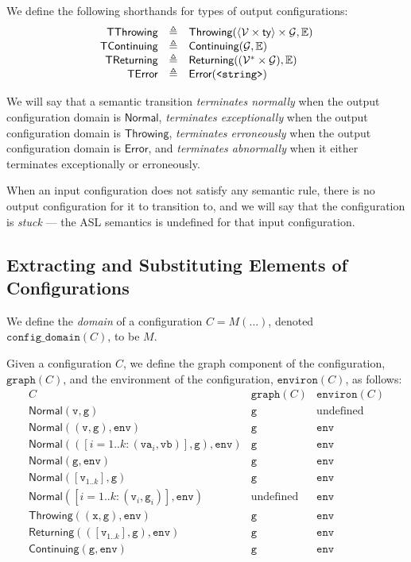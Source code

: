 \documentclass{book}
\newcommand\XGraphs[0]{\mathcal{G}}
\newcommand\vals[0]{\mathcal{V}}
\newcommand\configdomain[1]{\texttt{config\_domain}({#1})}
\newcommand\graphof[1]{\texttt{graph}({#1})}
\newcommand\environof[1]{\texttt{environ}({#1})}
\newcommand\TError[0]{\textsf{TError}}
\newcommand\TThrowing[0]{\textsf{TThrowing}}
\newcommand\TContinuing[0]{\textsf{TContinuing}}
\newcommand\TReturning[0]{\textsf{TReturning}}
\newcommand\Normal[0]{\textsf{Normal}}
\newcommand\Throwing[0]{\textsf{Throwing}}
\newcommand\Continuing[0]{\textsf{Continuing}}
\newcommand\Returning[0]{\textsf{Returning}}
\newcommand\Error[0]{\textsf{Error}}
\newcommand\env[0]{\texttt{env}}
\newcommand\vg[0]{\texttt{g}}
\newcommand\vv[0]{\texttt{v}}
\newcommand\vx[0]{\texttt{x}}
\begin{document}
We define the following shorthands for types of output configurations:
\[
  \begin{array}{rcl}
    \TThrowing        &\triangleq& \Throwing(\langle\vals \times \ty\rangle \times \XGraphs, \envs)\\
    \TContinuing      &\triangleq& \Continuing(\XGraphs, \envs)\\
    \TReturning       &\triangleq& \Returning((\vals^* \times \XGraphs), \envs)\\
    \TError           &\triangleq& \Error(\texttt{<string>})\\
  \end{array}
\]

We will say that a semantic transition \emph{terminates normally} when the output configuration domain is $\Normal$,
\emph{terminates exceptionally} when the output configuration domain is $\Throwing$,
\emph{terminates erroneously} when the output configuration domain is $\Error$,
and \emph{terminates abnormally} when it either terminates exceptionally or erroneously.

When an input configuration does not satisfy any semantic rule,
there is no output configuration for it to transition to, and we will say that
the configuration is \emph{stuck} --- the ASL semantics is undefined for that
input configuration.

\subsection{Extracting and Substituting Elements of Configurations}

We define the \emph{domain} of a configuration $C=M(\ldots)$, denoted $\configdomain{C}$, to be $M$.

Given a configuration $C$, we define the graph component of the configuration, $\graphof{C}$,
and the environment of the configuration, $\environof{C}$, as follows:
\[
\begin{array}{lcc}
  C & \graphof{C} & \environof{C}\\
  \hline
  \Normal(\vv,\vg) & \vg & \text{undefined}\\
  \Normal((\vv,\vg), \env) & \vg & \env\\
  \Normal(([i=1..k: (\texttt{va}_i,\texttt{vb})],\vg), \env) & \vg & \env\\
  \Normal(\vg, \env) & \vg & \env\\
  \Normal([\vv_{1..k}], \vg) & \vg & \env\\
  \Normal([i=1..k: (\vv_i,\vg_i)], \env) & \text{undefined} & \env\\
  \Throwing((\vx,\vg), \env) & \vg & \env\\
  \Returning(([\vv_{1..k}],\vg), \env) & \vg & \env\\
  \Continuing(\vg, \env) & \vg & \env\\
\end{array}
\]
\end{document}
